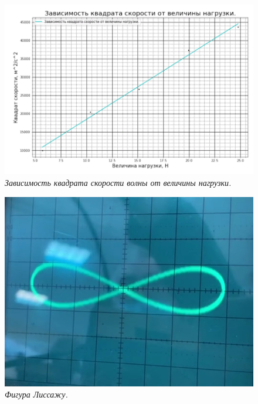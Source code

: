\documentclass[a4paper,12pt]{report}
\begin{document}
\begin{figure}[pt!]
	\includegraphics[scale=0.8]{lab145ris3.png}
	\caption{\textit{Зависимость квадрата скорости волны от величины нагрузки.}}
\end{figure}

\begin{figure}[pt!]
	\centering
	\includegraphics[scale=0.8]{lab145ris4.png}
	\caption{\textit{Фигура Лиссажу.}}
\end{figure}
\end{document}
